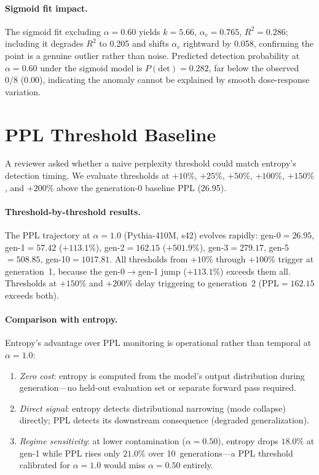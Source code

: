 \paragraph{Sigmoid fit impact.}
The sigmoid fit excluding $\alpha{=}0.60$ yields $k{=}5.66$, $\alpha_c{=}0.765$, $R^2{=}0.286$; including it degrades $R^2$ to 0.205 and shifts $\alpha_c$ rightward by 0.058, confirming the point is a genuine outlier rather than noise.
Predicted detection probability at $\alpha{=}0.60$ under the sigmoid model is $P(\mathrm{det}){=}0.282$, far below the observed 0/8 (0.00), indicating the anomaly cannot be explained by smooth dose-response variation.


\section{PPL Threshold Baseline}
\label{app:ppl_threshold}

A reviewer asked whether a naive perplexity threshold could match entropy's detection timing.
We evaluate thresholds at $+10\%$, $+25\%$, $+50\%$, $+100\%$, $+150\%$, and $+200\%$ above the generation-0 baseline PPL (26.95).

\paragraph{Threshold-by-threshold results.}
The PPL trajectory at $\alpha{=}1.0$ (Pythia-410M, s42) evolves rapidly: gen-0${=}26.95$, gen-1${=}57.42$ ($+113.1\%$), gen-2${=}162.15$ ($+501.9\%$), gen-3${=}279.17$, gen-5${=}508.85$, gen-10${=}1017.81$.
All thresholds from $+10\%$ through $+100\%$ trigger at generation~1, because the gen-0$\to$gen-1 jump ($+113.1\%$) exceeds them all.
Thresholds at $+150\%$ and $+200\%$ delay triggering to generation~2 (PPL${=}162.15$ exceeds both).

\paragraph{Comparison with entropy.}
Entropy's advantage over PPL monitoring is operational rather than temporal at $\alpha{=}1.0$:
\begin{enumerate}
\item \emph{Zero cost}: entropy is computed from the model's output distribution during generation---no held-out evaluation set or separate forward pass required.
\item \emph{Direct signal}: entropy detects distributional narrowing (mode collapse) directly; PPL detects its downstream consequence (degraded generalization).
\item \emph{Regime sensitivity}: at lower contamination ($\alpha{=}0.50$), entropy drops $18.0\%$ at gen-1 while PPL rises only $21.0\%$ over 10~generations---a PPL threshold calibrated for $\alpha{=}1.0$ would miss $\alpha{=}0.50$ entirely.
\end{enumerate}

